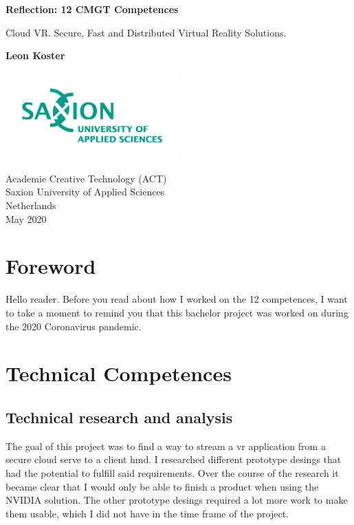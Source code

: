 \documentclass[]{article}
\begin{document}
\begin{titlepage}
   \begin{center}
       \vspace*{1cm}

       \textbf{Reflection: 12 CMGT Competences}

       \vspace{0.5cm}
       Cloud VR. Secure, Fast and Distributed Virtual Reality Solutions.
       \vspace{1.5cm}

       \textbf{Leon Koster}

       \vfill
            
       \vspace{0.8cm}
     
      \includegraphics[width=0.5\textwidth]{university}
            
       Academie Creative Technology (ACT)\\
       Saxion University of Applied Sciences\\
       Netherlands\\
       May 2020
            
   \end{center}
\end{titlepage}

\tableofcontents
\printnoidxglossary[type=\acronymtype]
\newpage

\section{Foreword}
Hello reader. Before you read about how I worked on the 12 competences, I want to take a moment to remind you that this bachelor project was worked on during the 2020 Coronavirus pandemic. 

\section{Technical Competences}
\subsection{Technical research and analysis}
The goal of this project was to find a way to stream a \acrshort{vr}  application from a secure cloud serve to a client \acrshort{hmd}. I researched different prototype desings that had the potential to fulfill said requirements. Over the course of the research it became clear that I would only be able to finish a product when using the NVIDIA solution. The other prototype desings required a lot more work to make them usable, which I did not have in the time frame of the project. 
\end{document}
